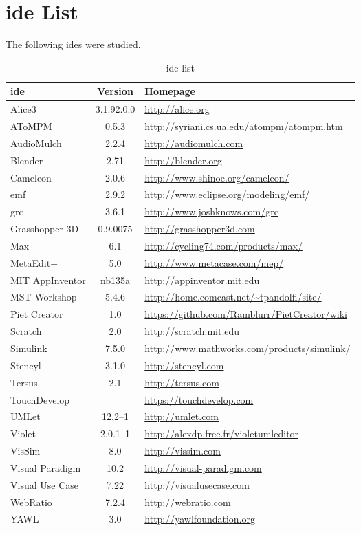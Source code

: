 \section{\acs{ide} List}
\label{sec:ide_list}

The following \acp{ide} were studied.

\noindent
\begin{table}[!htb]\centering
{}
\label{table:ides}
\begin{tabularx}{\textwidth}{@{}lcX@{}}\toprule
  \textbf{\ac{ide}} & \textbf{Version} & \textbf{Homepage} \\
  \midrule
  Alice3 & 3.1.92.0.0 & \url{http://alice.org} \\
  AToMPM & 0.5.3 & \url{http://syriani.cs.ua.edu/atompm/atompm.htm} \\
  AudioMulch & 2.2.4 & \url{http://audiomulch.com} \\
  Blender & 2.71 & \url{http://blender.org} \\
  Cameleon & 2.0.6 & \url{http://www.shinoe.org/cameleon/} \\
  \ac{emf} & 2.9.2 & \url{http://www.eclipse.org/modeling/emf/} \\
  \ac{grc} & 3.6.1 & \url{http://www.joshknows.com/grc} \\
  Grasshopper 3D & 0.9.0075 & \url{http://grasshopper3d.com} \\
  Max & 6.1 & \url{http://cycling74.com/products/max/} \\
  MetaEdit+ & 5.0 & \url{http://www.metacase.com/mep/} \\
  MIT AppInventor & nb135a & \url{http://appinventor.mit.edu} \\
  MST Workshop & 5.4.6 & \url{http://home.comcast.net/~tpandolfi/site/} \\
  Piet Creator & 1.0 & \url{https://github.com/Ramblurr/PietCreator/wiki} \\
  Scratch & 2.0 & \url{http://scratch.mit.edu} \\
  Simulink & 7.5.0 & \url{http://www.mathworks.com/products/simulink/} \\
  Stencyl & 3.1.0 & \url{http://stencyl.com} \\
  Tersus & 2.1 & \url{http://tersus.com} \\
  TouchDevelop & & \url{https://touchdevelop.com} \\
  UMLet & 12.2--1 & \url{http://umlet.com} \\
  Violet & 2.0.1--1 & \url{http://alexdp.free.fr/violetumleditor} \\
  VisSim & 8.0 & \url{http://vissim.com} \\
  Visual Paradigm & 10.2 & \url{http://visual-paradigm.com} \\
  Visual Use Case & 7.22 & \url{http://visualusecase.com} \\
  WebRatio & 7.2.4 & \url{http://webratio.com} \\
  YAWL & 3.0 & \url{http://yawlfoundation.org} \\
  \bottomrule
\end{tabularx}
\caption{\ac{ide} list}
\end{table}
